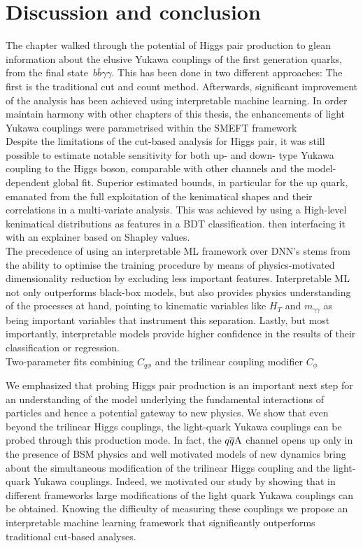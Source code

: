 \section{Discussion and conclusion \label{sec:concly}}
The chapter walked through the potential of Higgs pair production to glean information about the elusive Yukawa couplings of the first generation quarks, from the final state~$b\bar{b}\gamma \gamma$. This has been done in two different approaches: The first is the traditional cut and count method. Afterwards, significant improvement of the analysis has been achieved using interpretable machine learning.   In order maintain harmony with other chapters of this thesis, the enhancements of light Yukawa couplings were parametrised within the SMEFT framework \\ 
Despite the limitations of the cut-based analysis for Higgs pair, it was still possible to estimate notable sensitivity for both up- and down- type Yukawa coupling to the Higgs boson, comparable with other channels and the model-dependent global fit.  Superior estimated bounds, in particular for the up quark, emanated from the full exploitation of the kenimatical shapes and their correlations in a multi-variate analysis. This was achieved by using a High-level  kenimatical distributions as features in a BDT classification. then interfacing it with an explainer based on Shapley values. \\ The precedence of using an interpretable ML framework over DNN's stems from the ability to optimise the training procedure by means of physics-motivated dimensionality reduction by excluding less important features.  Interpretable ML not only outperforms black-box models, but also provides physics understanding of the processes at hand, pointing to kinematic variables like $H_T$ and $m_{\gamma\gamma}$ as being important variables that instrument this separation. Lastly, but most importantly,  interpretable models provide higher confidence in the results of their classification or regression.\\

Two-parameter fits combining $C_{q\phi}$ and the trilinear coupling modifier $C_\phi$

We emphasized that probing Higgs pair production is an important next step for an understanding of the model underlying the fundamental interactions of particles and hence a potential gateway to new physics. We show that even beyond the trilinear Higgs couplings, the light-quark Yukawa couplings can be probed through this production mode. In fact, the $q\overline q \rm A$ channel opens up only in the presence of BSM physics and well motivated models of new dynamics bring about the simultaneous modification of the trilinear Higgs coupling and the light-quark Yukawa couplings. Indeed, we motivated our study by showing that in different frameworks large modifications of the light quark Yukawa couplings can be obtained. Knowing the difficulty of measuring these couplings we propose an interpretable machine learning framework that significantly outperforms traditional cut-based analyses.


